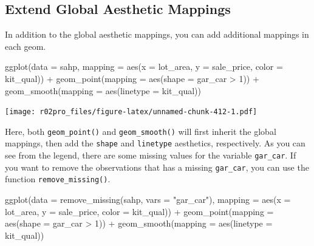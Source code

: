 \documentclass[
]{book}
\newenvironment{Shaded}{\begin{snugshade}}{\end{snugshade}}
\newcommand{\AttributeTok}[1]{\textcolor[rgb]{0.77,0.63,0.00}{#1}}
\newcommand{\DecValTok}[1]{\textcolor[rgb]{0.00,0.00,0.81}{#1}}
\newcommand{\FunctionTok}[1]{\textcolor[rgb]{0.00,0.00,0.00}{#1}}
\newcommand{\NormalTok}[1]{#1}
\newcommand{\SpecialCharTok}[1]{\textcolor[rgb]{0.00,0.00,0.00}{#1}}
\newcommand{\StringTok}[1]{\textcolor[rgb]{0.31,0.60,0.02}{#1}}
\begin{document}
\hypertarget{extend-global-aesthetic-mappings}{%
\subsection{Extend Global Aesthetic Mappings}\label{extend-global-aesthetic-mappings}}

In addition to the global aesthetic mappings, you can add additional mappings in each geom.

\begin{Shaded}
\begin{Highlighting}[]
\FunctionTok{ggplot}\NormalTok{(}\AttributeTok{data =}\NormalTok{ sahp, }\AttributeTok{mapping =} \FunctionTok{aes}\NormalTok{(}\AttributeTok{x =}\NormalTok{ lot\_area, }\AttributeTok{y =}\NormalTok{ sale\_price, }\AttributeTok{color =}\NormalTok{ kit\_qual)) }\SpecialCharTok{+} \FunctionTok{geom\_point}\NormalTok{(}\AttributeTok{mapping =} \FunctionTok{aes}\NormalTok{(}\AttributeTok{shape =}\NormalTok{ gar\_car }\SpecialCharTok{\textgreater{}} \DecValTok{1}\NormalTok{)) }\SpecialCharTok{+} \FunctionTok{geom\_smooth}\NormalTok{(}\AttributeTok{mapping =} \FunctionTok{aes}\NormalTok{(}\AttributeTok{linetype =}\NormalTok{ kit\_qual))}
\end{Highlighting}
\end{Shaded}

\texttt{[image: r02pro\_files/figure-latex/unnamed-chunk-412-1.pdf]}

Here, both \texttt{geom\_point()} and \texttt{geom\_smooth()} will first inherit the global mappings, then add the \texttt{shape} and \texttt{linetype} aesthetics, respectively. As you can see from the legend, there are some missing values for the variable \texttt{gar\_car}. If you want to remove the observations that has a missing \texttt{gar\_car}, you can use the function \texttt{remove\_missing()}.

\begin{Shaded}
\begin{Highlighting}[]
\FunctionTok{ggplot}\NormalTok{(}\AttributeTok{data =} \FunctionTok{remove\_missing}\NormalTok{(sahp, }\AttributeTok{vars =} \StringTok{"gar\_car"}\NormalTok{), }\AttributeTok{mapping =} \FunctionTok{aes}\NormalTok{(}\AttributeTok{x =}\NormalTok{ lot\_area, }\AttributeTok{y =}\NormalTok{ sale\_price, }\AttributeTok{color =}\NormalTok{ kit\_qual)) }\SpecialCharTok{+} \FunctionTok{geom\_point}\NormalTok{(}\AttributeTok{mapping =} \FunctionTok{aes}\NormalTok{(}\AttributeTok{shape =}\NormalTok{ gar\_car }\SpecialCharTok{\textgreater{}} \DecValTok{1}\NormalTok{)) }\SpecialCharTok{+} \FunctionTok{geom\_smooth}\NormalTok{(}\AttributeTok{mapping =} \FunctionTok{aes}\NormalTok{(}\AttributeTok{linetype =}\NormalTok{ kit\_qual))}
\end{Highlighting}
\end{Shaded}
\end{document}
